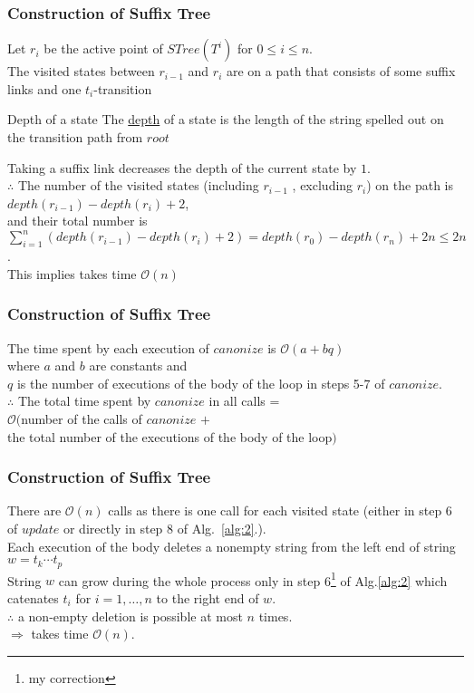 \documentclass[compress,usenames,dvipsnames]{beamer}
\newcommand*\diamonded[1]{\tikz[baseline=(char.base)]{
\node[shape=diamond,draw,inner sep=2pt] (char) {#1};}}
\newenvironment{definitionblock}[1]{
    \setbeamercolor{block title}{bg=cyan}
    \begin{block}{#1}}{\end{block}
}
\begin{document}
    \begin{frame}\frametitle{Construction of Suffix Tree}
        Let $r_i$ be the active point of $STree(T^{i})$ for $0 \leq i \leq n$. \\
        The visited states between $r_{i-1}$ and $r_i$ are on a path that consists of some suffix links and one $t_i$-transition
        \begin{definitionblock}{Depth of a state}
            The \underline{depth} of a state is the length of the string spelled out on the transition path from $root$
        \end{definitionblock}
        Taking a suffix link decreases the depth of the current state by $1$.\\
        $\therefore$ The number of the visited states (including $r_{i-1}$ , excluding $r_i$) on the path is $depth(r_{i-1}) - depth(r_i) + 2$, \\
        \hfill \break
        and their total number is $\sum_{i=1}^{n} (depth(r_{i-1}) - depth(r_i) + 2) = depth(r_0) - depth(r_n) + 2n \leq 2n$. \\
        This implies \diamonded{2} takes time $\mathcal{O}(n)$
    \end{frame}

    \begin{frame}\frametitle{Construction of Suffix Tree}
        The time spent by each execution of $canonize$ is $\mathcal{O}(a + bq)$ \\
        where $a$ and $b$ are constants and \\
        $q$ is the number of executions of the body of the loop in steps 5-7 of $canonize$. \\
        $\therefore$ The total time spent by $canonize$ in all calls = \\
        $\mathcal{O}($number of the calls of $canonize$ $+$ \\
        the total number of the executions of the body of the loop$)$ \\
    \end{frame}

    \begin{frame}\frametitle{Construction of Suffix Tree}
        There are $\mathcal{O}(n)$ calls as there is one call for each visited state (either in step 6 of $update$ or directly in step 8 of Alg.~\ref{alg:2}.). \\
        Each execution of the body deletes a nonempty string from the left end of string $w = t_k\cdots t_p$ \\
        String $w$ can grow during the whole process only in step 6\footnote[1]{my correction} of Alg.\ref{alg:2} which catenates $t_i$ for $i = 1,\ldots,n$ to the right end of $w$. \\
        \hfill \break
        $\therefore$ a non-empty deletion is possible at most $n$ times. \\
        $\Rightarrow$ \diamonded{1} takes time $\mathcal{O}(n)$.

    \end{frame}
\end{document}
